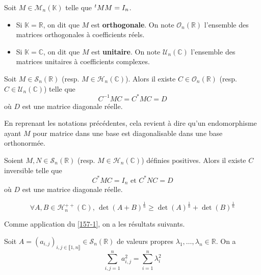 
  \begin{definition}
    Soit $M \in \mathcal{M}_n(\mathbb{K})$ telle que $\mathstrut ^t MM = I_n$.
    \begin{itemize}
      \item Si $\mathbb{K} = \mathbb{R}$, on dit que $M$ est \textbf{orthogonale}. On note $\mathcal{O}_n(\mathbb{R})$ l'ensemble des matrices orthogonales à coefficients réels.
      \item Si $\mathbb{K} = \mathbb{C}$, on dit que $M$ est \textbf{unitaire}. On note $\mathcal{U}_n(\mathbb{C})$ l'ensemble des matrices unitaires à coefficients complexes.
    \end{itemize}
  \end{definition}

  \begin{theorem}
    \label{157-1}
    Soit $M \in \mathcal{S}_n(\mathbb{R})$ (resp. $M \in \mathcal{H}_n(\mathbb{C})$). Alors il existe $C \in \mathcal{O}_n(\mathbb{R})$ (resp. $C \in \mathcal{U}_n(\mathbb{C})$) telle que
    \[ C^{-1}MC = C^* M C = D \]
    où $D$ est une matrice diagonale réelle.
  \end{theorem}

  \begin{remark}
    En reprenant les notations précédentes, cela revient à dire qu'un endomorphisme ayant $M$ pour matrice dans une base est diagonalisable dans une base orthonormée.
  \end{remark}

  \begin{corollary}
    Soient $M, N \in \mathcal{S}_n(\mathbb{R})$ (resp. $M \in \mathcal{H}_n(\mathbb{C})$) définies positives. Alors il existe $C$ inversible telle que
    \[ C^*MC = I_n \text{ et } C^*NC = D \]
    où $D$ est une matrice diagonale réelle.
  \end{corollary}


  \begin{application}
    \[ \forall A, B \in \mathcal{H}_n^{++}(\mathbb{C}), \, \det(A+B)^{\frac{1}{n}} \geq \det(A)^{\frac{1}{n}} + \det(B)^{\frac{1}{n}} \]
  \end{application}


  Comme application du \cref{157-1}, on a les résultats suivants.

  \begin{application}
    Soit $A = (a_{i,j})_{i,j \in \llbracket 1, n \rrbracket} \in \mathcal{S}_n(\mathbb{R})$ de valeurs propres $\lambda_1, \dots, \lambda_n \in \mathbb{R}$. On a
    \[ \sum_{i,j = 1}^n a_{i,j}^2 = \sum_{i=1}^n \lambda_i^2 \]
  \end{application}

